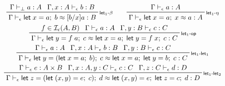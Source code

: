 \documentclass[acmsmall,screen,review]{acmart}
\newcommand{\mc}[1]{\ensuremath{\mathcal{#1}}}
\newcommand{\ms}[1]{\ensuremath{\mathsf{#1}}}
\newcommand{\linl}[1]{\iota_l\;{#1}}
\newcommand{\linr}[1]{\iota_r\;{#1}}
\newcommand{\letexpr}[3]{\ensuremath{\ms{let}\;#1 = #2;\;#3}}
\newcommand{\bhyp}[2]{#1 : #2}
\newcommand{\rle}[1]{{\scriptsize\textsf{#1}}}
\newcommand{\hasty}[4]{#1 \vdash_{#2} #3: {#4}}
\newcommand{\isop}[4]{#1 \in \mc{I}_{#4}(#2, #3)}
\newcommand{\teqv}{\approx}
\newcommand{\tmeq}[5]{#1 \vdash_{#2} #3 \teqv #4 : {#5}}
\begin{document}
\begin{figure}
  \begin{gather*}
    \prftree[r]{\rle{let$_1$-$\beta$}}
      {\hasty{\Gamma}{\bot}{a}{A}}
      {\hasty{\Gamma, \bhyp{x}{A}}{\epsilon}{b}{B}}
      {\tmeq{\Gamma}{\epsilon}{\letexpr{x}{a}{b}}{[b/x]a}{B}}
    \qquad
    \prftree[r]{\rle{let$_1$-$\eta$}}
      {\hasty{\Gamma}{\epsilon}{a}{A}}
      {\tmeq{\Gamma}{\epsilon}{\letexpr{x}{a}{x}}{a}{A}} 
    \\
    \prftree[r]{\rle{let$_1$-op}}
      {\isop{f}{A}{B}{\epsilon}}
      {\hasty{\Gamma}{\epsilon}{a}{A}}
      {\hasty{\Gamma, \bhyp{y}{B}}{\epsilon}{c}{C}}
      {\tmeq{\Gamma}{\epsilon}{\letexpr{y}{f\;a}{c}}
      {\letexpr{x}{a}{\letexpr{y}{f\;x}{c}}}{C}}
    \\
    \prftree[r]{\rle{let$_1$-let$_1$}}
      {\hasty{\Gamma}{\epsilon}{a}{A}}
      {\hasty{\Gamma, \bhyp{x}{A}}{\epsilon}{b}{B}}
      {\hasty{\Gamma, \bhyp{y}{B}}{\epsilon}{c}{C}}
      {\tmeq{\Gamma}{\epsilon}
        {\letexpr{y}{(\letexpr{x}{a}{b})}{c}}
        {\letexpr{x}{a}{\letexpr{y}{b}{c}}}{C}}
    \\ 
    \prftree[r]{\rle{let$_1$-let$_2$}}
      {\hasty{\Gamma}{\epsilon}{e}{A \times B}}
      {\hasty{\Gamma, \bhyp{x}{A}, \bhyp{y}{C}}{\epsilon}{c}{C}}
      {\hasty{\Gamma, \bhyp{z}{C}}{\epsilon}{d}{D}}
      {\tmeq{\Gamma}{\epsilon}
        {\letexpr{z}{(\letexpr{(x, y)}{e}{c})}{d}}
        {\letexpr{(x, y)}{e}{\letexpr{z}{c}{d}}}{D}}
    \\

\end{gather*}
\end{figure}
\end{document}

